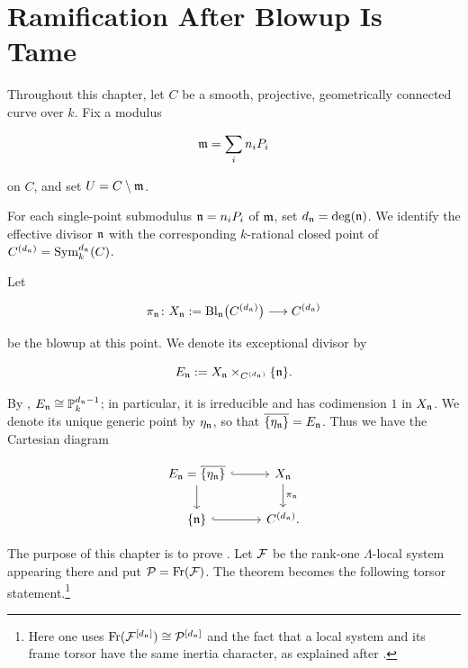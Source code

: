\chapter{Ramification After Blowup Is Tame}\label{section:ramification_after_blowup_is_tame}

Throughout this chapter, let $C$ be a smooth, projective, geometrically connected
curve over $k$. Fix a modulus

\[
    \mathfrak{m} = \sum_i n_i P_i
\]

on $C$, and set $U = C \setminus \mathfrak{m}$.

For each single-point submodulus $\mathfrak{n} = n_i P_i$ of $\mathfrak{m}$, set
$d_{\mathfrak{n}} = \deg(\mathfrak{n})$. We identify the effective divisor $\mathfrak{n}$ with
the corresponding $k$-rational closed point of
$C^{(d_{\mathfrak{n}})}=\operatorname{Sym}^{d_{\mathfrak{n}}}_k(C)$.

Let

\[
    \pi_{\mathfrak{n}} \colon
    X_{\mathfrak{n}} := \operatorname{Bl}_{\mathfrak{n}}\bigl(C^{(d_{\mathfrak{n}})}\bigr)
    \longrightarrow C^{(d_{\mathfrak{n}})}
\]

be the blowup at this point. We denote its exceptional divisor by

\[
    E_{\mathfrak{n}} := X_{\mathfrak{n}} \times_{C^{(d_{\mathfrak{n}})}} \{\mathfrak{n}\}.
\]

By
,
$E_{\mathfrak{n}}\cong\mathbb P_k^{d_{\mathfrak{n}}-1}$; in particular, it is irreducible and
has codimension $1$ in $X_{\mathfrak{n}}$. We denote its unique generic point by
$\eta_{\mathfrak{n}}$, so that $\overline{\{\eta_{\mathfrak{n}}\}}=E_{\mathfrak{n}}$. Thus we have the
Cartesian diagram

\begin{equation}\label{equation:blowup_diagram_ndls}
\begin{tikzcd}
E_\ndls = \overline{\{\eta_\ndls\}}
    \arrow[r, hook] \arrow[d]
  & X_\ndls \arrow[d, "\pi_\ndls"] \\
\{\ndls\} \arrow[r, hook]
  & C^{(d_\ndls)}.
\end{tikzcd}
\end{equation}

The purpose of this chapter is to prove
. Let $\mathcal{F}$ be
the rank-one $\Lambda$-local system appearing there and put
$\mathcal{P}=\operatorname{Fr}(\mathcal{F})$. The theorem becomes the following torsor
statement.\footnote{Here one uses
$\operatorname{Fr}(\mathcal{F}^{[d_{\mathfrak{n}}]})\cong\mathcal{P}^{[d_{\mathfrak{n}}]}$ and the fact that a
local system and its frame torsor have the same inertia character, as
explained after .}

